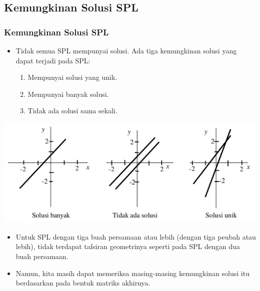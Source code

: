 \documentclass[pdflatex,compress,mathserif]{beamer}
\begin{document}
\subsection{Kemungkinan Solusi SPL}

\begin{frame}
	\frametitle{Kemungkinan Solusi SPL}
	\begin{itemize}
		\item Tidak semua SPL mempunyai solusi. Ada tiga kemungkinan solusi yang dapat terjadi pada SPL:
		\begin{enumerate}
			\item Mempunyai solusi yang unik.
			\item Mempunyai banyak solusi.
			\item Tidak ada solusi sama sekali.
		\end{enumerate}
	\end{itemize}
	\begin{center}
		\includegraphics[width=0.9\linewidth]{img/img01}
	\end{center}
\end{frame}

\begin{frame}
	\begin{itemize}
		\item Untuk SPL dengan tiga buah persamaan atau lebih (dengan tiga peubah atau lebih), tidak terdapat tafsiran geometrinya seperti pada SPL dengan dua buah persamaan.
		\item Namun, kita masih dapat memeriksa masing-masing kemungkinan solusi itu berdasarkan pada bentuk matriks akhirnya.
	\end{itemize}
\end{frame}
\end{document}
